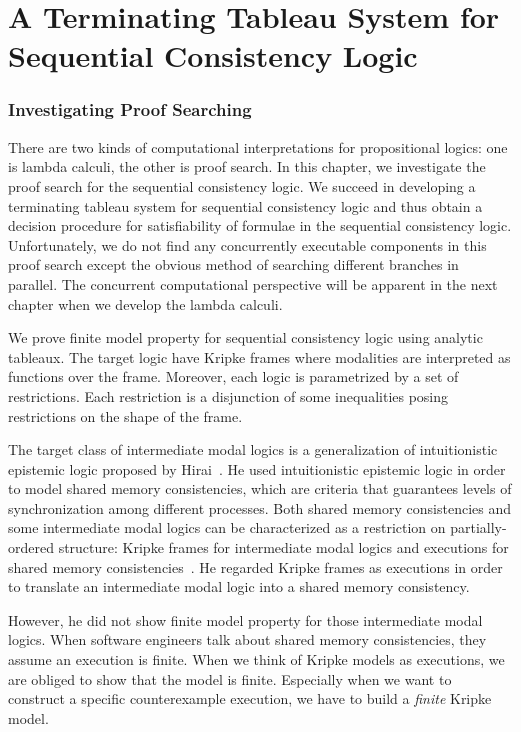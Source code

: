 \chapter{A Terminating Tableau System for Sequential Consistency Logic}

  \subsection{Investigating Proof Searching}
  There are two kinds of computational interpretations for propositional
  logics: one is lambda calculi, the other is proof search.
  In this chapter, we investigate the proof search for the sequential
  consistency logic.  We succeed in developing a terminating tableau
  system for sequential consistency logic and thus obtain a decision
  procedure for satisfiability of formulae in the sequential consistency
  logic.  Unfortunately, we do not find any concurrently executable
  components in this proof search except the obvious method of
  searching different branches in parallel.  The concurrent computational
  perspective will be apparent in the next chapter when we develop the
  lambda calculi.

 We prove finite model property for sequential consistency logic
 using analytic tableaux.
 The target logic have Kripke frames where modalities are interpreted as
 functions over the frame.  Moreover, each logic is parametrized by a
 set of restrictions.  Each restriction is a disjunction of some
 inequalities posing restrictions on the shape of the frame.

 The target class of intermediate modal logics is a generalization of
 intuitionistic epistemic logic proposed by Hirai~\cite{hirailpar}.
 He used intuitionistic epistemic logic in order to model shared memory
 consistencies, which are criteria that guarantees levels of
 synchronization among different processes.
 Both shared memory consistencies and some intermediate modal logics
 can be characterized as a restriction on
 partially-ordered structure:
 Kripke frames for intermediate modal logics
 and executions for shared memory
 consistencies~\cite{steinke2004unified}.
 He regarded Kripke frames as executions in order to translate
 an intermediate modal logic into a shared memory
 consistency.

 However, he did not show finite model property for those
 intermediate modal logics.  When software engineers talk about shared
 memory consistencies, they assume an execution is finite.
 When we think of Kripke models as executions, we are obliged to show
 that the model is finite.
 Especially when we want to construct a specific counterexample execution,
 we have to build a \textit{finite} Kripke model.

